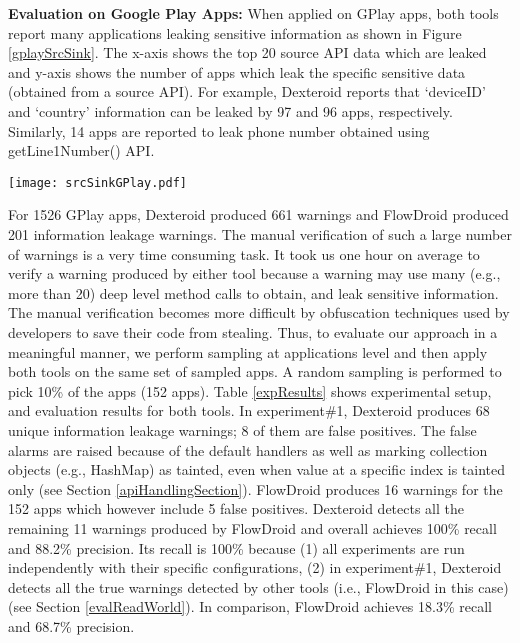 \documentclass[10pt]{elsarticle}
\begin{document}
{\noindent \bf Evaluation on Google Play Apps:} When applied on GPlay apps, both tools report many applications leaking sensitive information as shown in Figure \ref{gplaySrcSink}. The x-axis shows the top 20 source API data which are leaked and y-axis shows the number of apps which leak the specific sensitive data (obtained from a source API). For example, Dexteroid reports that `deviceID' and `country' information can be leaked by 97 and 96 apps, respectively. Similarly, 14 apps are reported to leak phone number obtained using {\ttfamily getLine1Number()} API.

\begin{figure*}[ht]
\centering
\texttt{[image: srcSinkGPlay.pdf]}
\caption{Information Leakage Detection by Dexteroid and FlowDroid in 1526 Google Play Apps}
\label{gplaySrcSink}
\end{figure*}


For 1526 GPlay apps, Dexteroid produced 661 warnings and FlowDroid produced 201 information leakage warnings. The manual verification of such a large number of warnings is a very time consuming task. It took us one hour on average to verify a warning produced by either tool because a warning may use many (e.g., more than 20) deep level method calls to obtain, and leak sensitive information. The manual verification becomes more difficult by obfuscation techniques used by developers to save their code from stealing. Thus, to evaluate our approach in a meaningful manner, we perform sampling at applications level and then apply both tools on the same set of sampled apps. A random sampling is performed to pick 10\% of the apps (152 apps). Table \ref{expResults} shows experimental setup, and evaluation results for both tools. In experiment\#1, Dexteroid produces 68 unique information leakage warnings; 8 of them are false positives. The false alarms are raised because of the default handlers as well as marking collection objects (e.g., {\ttfamily HashMap}) as tainted, even when value at a specific index is tainted only (see Section \ref{apiHandlingSection}). FlowDroid produces 16 warnings for the 152 apps which however include 5 false positives. Dexteroid detects all the remaining 11 warnings produced by FlowDroid and overall achieves 100\% recall and 88.2\% precision. Its recall is 100\% because (1) all experiments are run independently with their specific configurations, (2) in experiment\#1, Dexteroid detects all the true warnings detected by other tools (i.e., FlowDroid in this case) (see Section \ref{evalReadWorld}). In comparison, FlowDroid achieves 18.3\% recall and 68.7\% precision.
\end{document}

